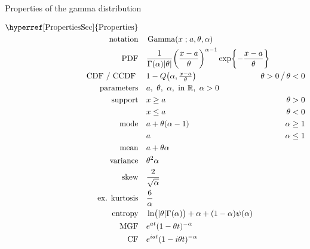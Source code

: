 

\begin{table*}[tp!]

\caption[Gamma distribution -- Properties]{Properties of the gamma distribution}

\begin{align*}
\text{\hyperref[PropertiesSec]{Properties}}  \quad& \\
\text{notation} \quad &  \op{Gamma}(x\given a, \theta, \alpha) 	\checked
\\
\text{PDF} \quad &
\frac{1}{\Gamma(\alpha)\Left|\theta\Right|} 
\Left(\frac{x-a}{\theta}\Right)^{\alpha  -1}
\exp \Left\{
-  \frac{x-a}{\theta}
\Right\}
\checked \hspace{-8em}						
\\ 
\text{CDF / CCDF } \quad  &    1-Q\Left(\alpha, \tfrac{x - a }{\theta} \Right) \checked
& \theta>0 \, \big/ \,  \theta<0
\\
\text{parameters}\quad &   a,\ \theta,\ \alpha,\  \text{in } \Real, \ \alpha>0
\\
\text{support} \quad &     x \geq a &  \theta > 0
\\
&   x\leq a  &  \theta < 0 
\\
\text{mode} \quad&   a+ \theta (\alpha-1)
& \alpha   \geq 1 \checked
\\ & a & \alpha   \le 1 \checked
\\
\text{mean} \quad& a  + \theta \alpha \checked
\\
\text{variance}  \quad&   \theta^2 \alpha \checked & 
\\
\text{skew} \quad  &  \frac{2}{\sqrt{\alpha}}  \checked
\\
\text{ex. kurtosis} \quad  &  \frac{6}{\alpha} \checked
\\
\text{entropy} \quad& 
\ln \bigl(|\theta| \Gamma(\alpha) \bigr)+\alpha + \Left( 1 - \alpha\Right) \psi(\alpha) \checked
\\
\text{MGF} \quad  &   e^{a t} (1- \theta t)^{-\alpha}	\checked
\\
\text{CF} \quad  &  e^{i a t} (1- i \theta t)^{-\alpha}		\checked
\end{align*}
\end{table*}


